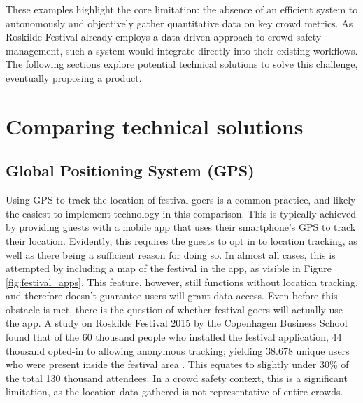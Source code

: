 These examples highlight the core limitation: the absence of an efficient system to autonomously and objectively gather quantitative data on key crowd metrics. As Roskilde Festival already employs a data-driven approach to crowd safety management, such a system would integrate directly into their existing workflows. The following sections explore potential technical solutions to solve this challenge, eventually proposing a product.

\section{Comparing technical solutions}

\subsection{Global Positioning System (GPS)}
\label{sec:gps}

Using GPS to track the location of festival-goers is a common practice, and likely the easiest to implement technology in this comparison. This is typically achieved by providing guests with a mobile app that uses their smartphone's GPS to track their location. Evidently, this requires the guests to opt in to location tracking, as well as there being a sufficient reason for doing so. In almost all cases, this is attempted by including a map of the festival in the app, as visible in Figure \ref{fig:festival_apps}. This feature, however, still functions without location tracking, and therefore doesn't guarantee users will grant data access. Even before this obstacle is met, there is the question of whether festival-goers will actually use the app. A study on Roskilde Festival 2015 by the Copenhagen Business School  found that of the 60 thousand people who installed the festival application, 44 thousand opted-in to allowing anonymous tracking; yielding 38.678 unique users who were present inside the festival area \cite{rf_app}. This equates to slightly under 30\% of the total 130 thousand attendees. In a crowd safety context, this is a significant limitation, as the location data gathered is not representative of entire crowds.

